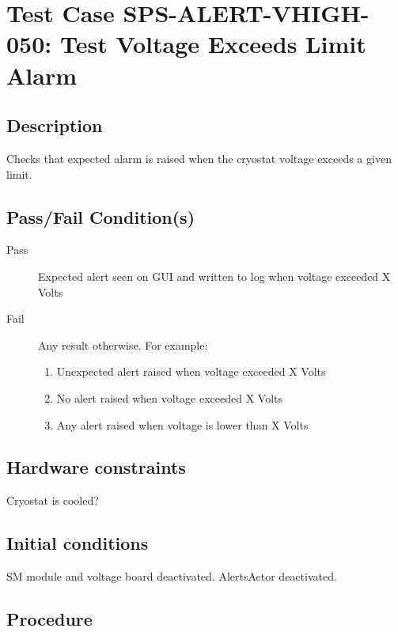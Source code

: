 \section{Test Case SPS-ALERT-VHIGH-050: Test Voltage Exceeds Limit Alarm}

\subsection{Description}

Checks that expected alarm is raised when the cryostat voltage exceeds a given limit.

\subsection{Pass/Fail Condition(s)}

\begin{description}
\item [Pass] Expected alert seen on GUI and written to log when voltage exceeded X Volts
\item [Fail] Any result otherwise. For example:

\begin{enumerate}
    \item Unexpected alert raised when voltage exceeded X Volts
    \item No alert raised when voltage exceeded X Volts
    \item Any alert raised when voltage is lower than X Volts
\end{enumerate}
\end{description}

\subsection{Hardware constraints}

Cryostat is cooled?

\subsection{Initial conditions}

SM module and voltage board deactivated. AlertsActor deactivated.

\subsection{Procedure}

